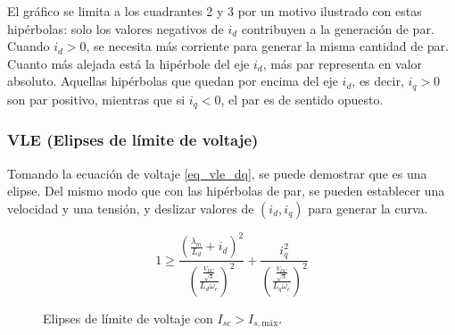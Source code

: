 El gráfico se limita a los cuadrantes 2 y 3 por un motivo ilustrado con estas hipérbolas: solo los valores negativos de \(i_d\) contribuyen a la generación de par. Cuando \(i_d>0\), se necesita más corriente para generar la misma cantidad de par. Cuanto más alejada está la hipérbole del eje \(i_d\), más par representa en valor absoluto. Aquellas hipérbolas que quedan por encima del eje \(i_d\), es decir, \(i_q > 0\) son par positivo, mientras que si \(i_q < 0\), el par es de sentido opuesto.

\subsubsection{VLE (Elipses de límite de voltaje)}

Tomando la ecuación de voltaje \ref{eq_vle_dq}, se puede demostrar que es una elipse. Del mismo modo que con las hipérbolas de par, se pueden establecer una velocidad y una tensión, y deslizar valores de \((i_d, i_q)\) para generar la curva.

\begin{equation}
1 \geq \frac{\left(\frac{\lambda_m}{L_d}+i_d\right)^2}{\left(\frac{\frac{V_{DC}}{\sqrt{3}}}{L_d\omega_e}\right)^2}+\frac{i_q^2}{\left(\frac{\frac{V_{DC}}{\sqrt{3}}}{L_q\omega_e}\right)^2}
\end{equation}




\begin{figure}[H]
  \centering
  \caption{Elipses de límite de voltaje con $I_{sc} > I_{s,\text{máx}}$.}
\end{figure}


